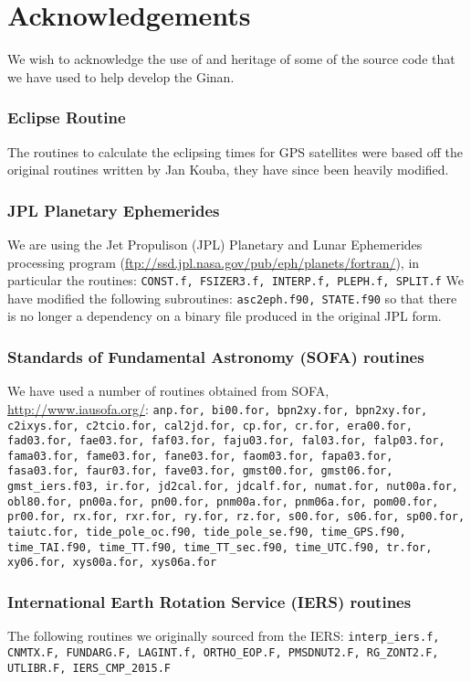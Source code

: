 \chapter{Acknowledgements}
\label{ch:Acknowledgements}
\sloppy
\begin{fullwidth}

We wish to acknowledge the use of and heritage of some of the source code that we have used to help develop the Ginan.

\subsection{Eclipse Routine}
\noindent The routines to calculate the eclipsing times for GPS satellites were based off the original routines written by Jan Kouba, they have since been heavily modified.

\subsection{JPL Planetary Ephemerides}
\noindent We are using the Jet Propulison (JPL) Planetary and Lunar Ephemerides processing program (\url{ftp://ssd.jpl.nasa.gov/pub/eph/planets/fortran/}), in particular the routines:
\texttt{CONST.f, FSIZER3.f, INTERP.f, PLEPH.f, SPLIT.f}
We have modified the following subroutines:
\texttt{asc2eph.f90, STATE.f90}
so that there is no longer a dependency on a binary file produced in the original JPL form.

\subsection{Standards of Fundamental Astronomy (SOFA) routines}
\noindent We have used a number of routines obtained from SOFA, \url{http://www.iausofa.org/}:
\texttt{anp.for, bi00.for, bpn2xy.for, bpn2xy.for, c2ixys.for, c2tcio.for, cal2jd.for, cp.for, cr.for, era00.for, fad03.for, fae03.for, faf03.for, faju03.for, fal03.for, falp03.for, fama03.for, fame03.for, fane03.for, faom03.for, fapa03.for, fasa03.for, faur03.for, fave03.for, gmst00.for, gmst06.for, gmst\_iers.f03, ir.for, jd2cal.for, jdcalf.for, numat.for, nut00a.for, obl80.for, pn00a.for, pn00.for, pnm00a.for, pnm06a.for, pom00.for, pr00.for, rx.for, rxr.for, ry.for, rz.for, s00.for, s06.for, sp00.for, taiutc.for, tide\_pole\_oc.f90, tide\_pole\_se.f90, time\_GPS.f90, time\_TAI.f90, time\_TT.f90, time\_TT\_sec.f90, time\_UTC.f90, tr.for, xy06.for, xys00a.for, xys06a.for
}


\subsection{International Earth Rotation Service (IERS) routines}
\noindent The following routines we originally sourced from the IERS:
\texttt{interp\_iers.f, CNMTX.F, FUNDARG.F, LAGINT.f, ORTHO\_EOP.F, PMSDNUT2.F, RG\_ZONT2.F, UTLIBR.F, IERS\_CMP\_2015.F}


\end{fullwidth}